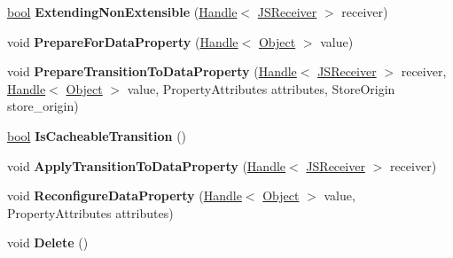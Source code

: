 \begin{DoxyCompactItemize}
\mbox{\hyperlink{classbool}{bool}} {\bfseries Extending\+Non\+Extensible} (\mbox{\hyperlink{classv8_1_1internal_1_1Handle}{Handle}}$<$ \mbox{\hyperlink{classv8_1_1internal_1_1JSReceiver}{J\+S\+Receiver}} $>$ receiver)
\item 
\mbox{\label{classv8_1_1internal_1_1LookupIterator_a000dd63b89214020aa31df70cfb5423a}} 
void {\bfseries Prepare\+For\+Data\+Property} (\mbox{\hyperlink{classv8_1_1internal_1_1Handle}{Handle}}$<$ \mbox{\hyperlink{classv8_1_1internal_1_1Object}{Object}} $>$ value)
\item 
\mbox{\label{classv8_1_1internal_1_1LookupIterator_afb22f2a68a43aa02cab9cc562319dcca}} 
void {\bfseries Prepare\+Transition\+To\+Data\+Property} (\mbox{\hyperlink{classv8_1_1internal_1_1Handle}{Handle}}$<$ \mbox{\hyperlink{classv8_1_1internal_1_1JSReceiver}{J\+S\+Receiver}} $>$ receiver, \mbox{\hyperlink{classv8_1_1internal_1_1Handle}{Handle}}$<$ \mbox{\hyperlink{classv8_1_1internal_1_1Object}{Object}} $>$ value, Property\+Attributes attributes, Store\+Origin store\+\_\+origin)
\item 
\mbox{\label{classv8_1_1internal_1_1LookupIterator_a7ad4f96f7b5910f26c0499410722f6e7}} 
\mbox{\hyperlink{classbool}{bool}} {\bfseries Is\+Cacheable\+Transition} ()
\item 
\mbox{\label{classv8_1_1internal_1_1LookupIterator_ade6298a0923ea1215ef87e6325922351}} 
void {\bfseries Apply\+Transition\+To\+Data\+Property} (\mbox{\hyperlink{classv8_1_1internal_1_1Handle}{Handle}}$<$ \mbox{\hyperlink{classv8_1_1internal_1_1JSReceiver}{J\+S\+Receiver}} $>$ receiver)
\item 
\mbox{\label{classv8_1_1internal_1_1LookupIterator_a5e550ce94ad5b30a2f015327885116e3}} 
void {\bfseries Reconfigure\+Data\+Property} (\mbox{\hyperlink{classv8_1_1internal_1_1Handle}{Handle}}$<$ \mbox{\hyperlink{classv8_1_1internal_1_1Object}{Object}} $>$ value, Property\+Attributes attributes)
\item 
\mbox{\label{classv8_1_1internal_1_1LookupIterator_a6993053451b18dd631d19b70b9a0e1c8}} 
void {\bfseries Delete} ()

\end{DoxyCompactItemize}
